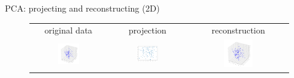 \begin{frame}{PCA: projecting and reconstructing (2D)}
\begin{figure}
\begin{tabular}{ccc}
\small{original data} & \small{projection} & \small{reconstruction}\\
\includegraphics[width=0.3\textwidth]{img/pca/original.pdf}&
\includegraphics[width=0.3\textwidth]{img/pca/proj.pdf}&
\includegraphics[width=0.3\textwidth]{img/pca/reconstr.pdf}
\end{tabular}
\end{figure}
\end{frame}